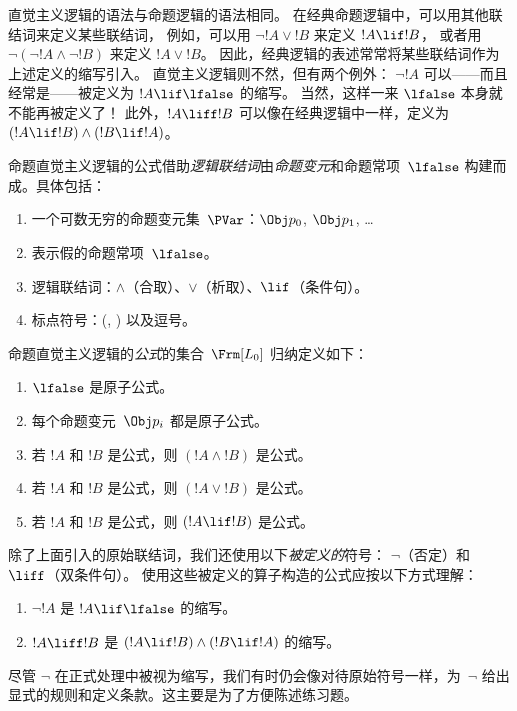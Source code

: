 \documentclass[../../../include/open-logic-section]{subfiles}
\begin{document}


直觉主义逻辑的语法与命题逻辑的语法相同。
在经典命题逻辑中，可以用其他联结词来定义某些联结词，
例如，可以用 $\lnot !A \lor !B$ 来定义 $!A \lif !B$，
或者用 $\lnot(\lnot !A \land \lnot !B)$ 来定义 $!A \lor !B$。
因此，经典逻辑的表述常常将某些联结词作为上述定义的缩写引入。
直觉主义逻辑则不然，但有两个例外：
$\lnot !A$ 可以——而且经常是——被定义为 $!A \lif \lfalse$ 的缩写。
当然，这样一来 $\lfalse$ 本身就不能再被定义了！
此外，$!A \liff !B$ 可以像在经典逻辑中一样，定义为 $(!A \lif !B) \land (!B \lif
!A)$。

命题直觉主义逻辑的公式借助\emph{逻辑联结词}由\emph{命题变元}和命题常项~$\lfalse$
构建而成。具体包括：

\begin{enumerate}
\item 一个可数无穷的命题变元集~$\PVar$：$\Obj p_0$, $\Obj p_1$, \dots
\item 表示假的命题常项~$\lfalse$。
\item 逻辑联结词：$\land$（合取）、$\lor$（析取）、$\lif$（条件句）。
\item 标点符号：(, ) 以及逗号。
\end{enumerate}

\begin{defn}[公式]
命题直觉主义逻辑的\emph{公式}的集合~$\Frm[L_0]$ 归纳定义如下：
\begin{enumerate}
\item $\lfalse$ 是原子公式。
\item 每个命题变元~$\Obj p_i$ 都是原子公式。
\item 若 $!A$ 和 $!B$ 是公式，则 $(!A \land !B)$ 是公式。
\item 若 $!A$ 和 $!B$ 是公式，则 $(!A \lor !B)$ 是公式。
\item 若 $!A$ 和 $!B$ 是公式，则 $(!A \lif !B)$ 是公式。
\end{enumerate}
\end{defn}

除了上面引入的原始联结词，我们还使用以下\emph{被定义的}符号：
$\lnot$（否定）和 $\liff$（双条件句）。
使用这些被定义的算子构造的公式应按以下方式理解：

\begin{enumerate}
\item $\lnot !A$ 是 $!A \lif \lfalse$ 的缩写。
\item $!A \liff !B$ 是 $(!A \lif !B) \land (!B
  \lif !A)$ 的缩写。
\end{enumerate}

尽管 $\lnot$ 在正式处理中被视为缩写，我们有时仍会像对待原始符号一样，为~$\lnot$ 给出显式的规则和定义条款。这主要是为了方便陈述练习题。
\end{document}

